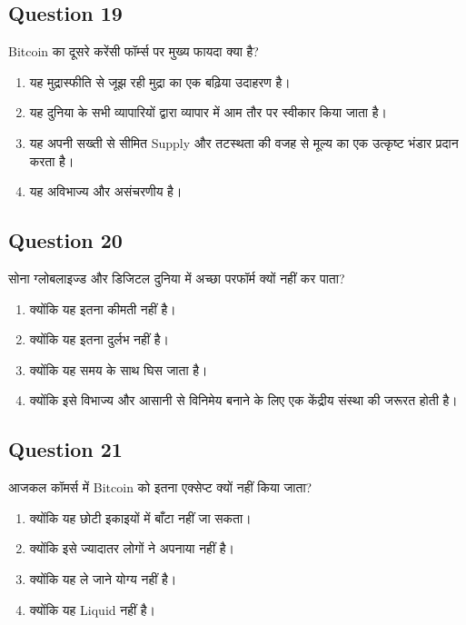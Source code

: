 \documentclass[12pt,a4paper]{article}
\begin{document}
\bigskip


\subsection*{Question 19}
Bitcoin का दूसरे करेंसी फॉर्म्स पर मुख्य फायदा क्या है?

\begin{enumerate}[label=\Alph*., leftmargin=*]
\item यह मुद्रास्फीति से जूझ रही मुद्रा का एक बढ़िया उदाहरण है।
\item यह दुनिया के सभी व्यापारियों द्वारा व्यापार में आम तौर पर स्वीकार किया जाता है।
\item यह अपनी सख्ती से सीमित Supply और तटस्थता की वजह से मूल्य का एक उत्कृष्ट भंडार प्रदान करता है।
\item यह अविभाज्य और असंचरणीय है।
\end{enumerate}

\bigskip


\subsection*{Question 20}
सोना ग्लोबलाइज्ड और डिजिटल दुनिया में अच्छा परफॉर्म क्यों नहीं कर पाता?

\begin{enumerate}[label=\Alph*., leftmargin=*]
\item क्योंकि यह इतना कीमती नहीं है।
\item क्योंकि यह इतना दुर्लभ नहीं है।
\item क्योंकि यह समय के साथ घिस जाता है।
\item क्योंकि इसे विभाज्य और आसानी से विनिमेय बनाने के लिए एक केंद्रीय संस्था की जरूरत होती है।
\end{enumerate}

\bigskip


\subsection*{Question 21}
आजकल कॉमर्स में Bitcoin को इतना एक्सेप्ट क्यों नहीं किया जाता?

\begin{enumerate}[label=\Alph*., leftmargin=*]
\item क्योंकि यह छोटी इकाइयों में बाँटा नहीं जा सकता।
\item क्योंकि इसे ज्यादातर लोगों ने अपनाया नहीं है।
\item क्योंकि यह ले जाने योग्य नहीं है।
\item क्योंकि यह Liquid नहीं है।
\end{enumerate}
\end{document}
